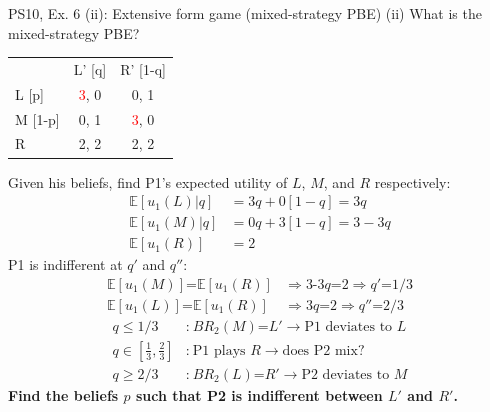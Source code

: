 \begin{frame}{PS10, Ex. 6 (ii): Extensive form game (mixed-strategy PBE)}
    (ii) What is the mixed-strategy PBE? \vspace{-8pt}
    \begin{multicols}{2}
      \begin{table}
        \begin{tabular}{l|c|c|}
          \multicolumn{1}{c}{} & \multicolumn{1}{c}{L' [q]} & \multicolumn{1}{c}{R' [1-q]} \\\cline{2-3}
          L [p]   & \textcolor{red}{3}, 0 & 0, \color{blue}1 \\\cline{2-3}
          M [1-p] & 0, \color{blue}1 & \textcolor{red}{3}, 0 \\\cline{2-3}
          R       & 2, \color{blue}2 & 2, \color{blue}2 \\\cline{2-3}
        \end{tabular}
      \end{table} \vspace{-4pt}
      Given his beliefs, find P1's expected utility of $L$, $M$, and $R$ respectively: \vspace{-4pt}
      \begin{align*}
        \mathbb{E}[u_1(L)|q]&=3q+0[1-q]=3q\\
        \mathbb{E}[u_1(M)|q]&=0q+3[1-q]=3-3q\\
        \mathbb{E}[u_1(R)]&=2
      \end{align*}
      P1 is indifferent at $q'$ and $q''$: \vspace{-6pt}
      \begin{align*}
        \mathbb{E}[u_1(M)]\text{=}\mathbb{E}[u_1(R)]&\Rightarrow \text{3-3}q\text{=}2\Rightarrow q'\text{=}1/3\\
        \mathbb{E}[u_1(L)]\text{=}\mathbb{E}[u_1(R)]&\Rightarrow 3q\text{=}2\Rightarrow q''\text{=}2/3
      \end{align*} \vspace{-16pt}
      \begin{align*}
        q\leq1/3&\text{:}\ BR_2(M)\text{=}L'\rightarrow\text{P1 deviates to }L\\
        q\text{$\in$}{\textstyle\left[\frac{1}{3},\frac{2}{3}\right]}&\text{:}\ \text{P1 plays }R\rightarrow\text{does P2 mix?}\\
        q\geq2/3&\text{:}\ BR_2(L)\text{=}R'\rightarrow\text{P2 deviates to }M
      \end{align*}
      \textbf{Find the beliefs $p$ such that P2 is indifferent between $L'$ and $R'$.}

\end{multicols}
\end{frame}
